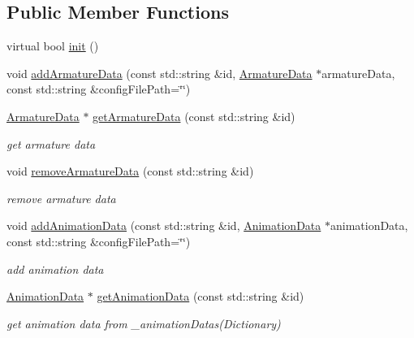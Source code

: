 \subsection*{Public Member Functions}
\begin{DoxyCompactItemize}
\item 
virtual bool \hyperlink{classcocostudio_1_1ArmatureDataManager_ae06a336867256bd67f78ec38e14e9fd9}{init} ()
\item 
void \hyperlink{classcocostudio_1_1ArmatureDataManager_ad07ea60328afc77cd0787d6fc79ae519}{add\+Armature\+Data} (const std\+::string \&id, \hyperlink{classcocostudio_1_1ArmatureData}{Armature\+Data} $\ast$armature\+Data, const std\+::string \&config\+File\+Path=\char`\"{}\char`\"{})
\item 
\hyperlink{classcocostudio_1_1ArmatureData}{Armature\+Data} $\ast$ \hyperlink{classcocostudio_1_1ArmatureDataManager_a8ae85e5c414861b3ca843d9497e27cb1}{get\+Armature\+Data} (const std\+::string \&id)
\begin{DoxyCompactList}\small\item\em get armature data \end{DoxyCompactList}\item 
void \hyperlink{classcocostudio_1_1ArmatureDataManager_ab749f66043b0dd603720ff8c31f2a3b6}{remove\+Armature\+Data} (const std\+::string \&id)
\begin{DoxyCompactList}\small\item\em remove armature data \end{DoxyCompactList}\item 
void \hyperlink{classcocostudio_1_1ArmatureDataManager_a36a1eb7cdc144ce7ee0a17bcc3f5726d}{add\+Animation\+Data} (const std\+::string \&id, \hyperlink{classcocostudio_1_1AnimationData}{Animation\+Data} $\ast$animation\+Data, const std\+::string \&config\+File\+Path=\char`\"{}\char`\"{})
\begin{DoxyCompactList}\small\item\em add animation data \end{DoxyCompactList}\item 
\hyperlink{classcocostudio_1_1AnimationData}{Animation\+Data} $\ast$ \hyperlink{classcocostudio_1_1ArmatureDataManager_a256a53756d5a9888f18d6474ff82c199}{get\+Animation\+Data} (const std\+::string \&id)
\begin{DoxyCompactList}\small\item\em get animation data from \+\_\+animation\+Datas(\+Dictionary) \end{DoxyCompactList}\item 

\end{DoxyCompactItemize}
